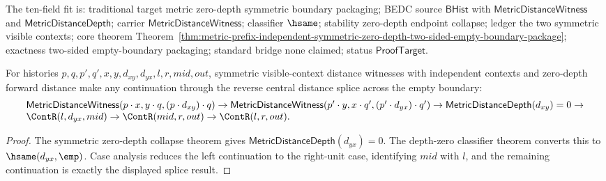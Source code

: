The ten-field fit is: traditional target metric zero-depth symmetric boundary
packaging; BEDC source $\mathsf{BHist}$ with
$\mathsf{MetricDistanceWitness}$ and $\mathsf{MetricDistanceDepth}$; carrier
$\mathsf{MetricDistanceWitness}$; classifier $\hsame$; stability zero-depth
endpoint collapse; ledger the two symmetric visible contexts; core theorem
Theorem~\ref{thm:metric-prefix-independent-symmetric-zero-depth-two-sided-empty-boundary-package};
exactness two-sided empty-boundary packaging; standard bridge none claimed;
status $\mathsf{ProofTarget}$.

\begin{theorem}
\label{thm:metric-prefix-independent-symmetric-zero-depth-continuation-splice}
For histories $p,q,p',q',x,y,d_{xy},d_{yx},l,r,mid,out$, symmetric
visible-context distance witnesses with independent contexts and zero-depth
forward distance make any continuation through the reverse central distance
splice across the empty boundary:
$$
\begin{array}{l}
\mathsf{MetricDistanceWitness}(p\cdot x,y\cdot q,(p\cdot d_{xy})\cdot q)
\to
\mathsf{MetricDistanceWitness}(p'\cdot y,x\cdot q',(p'\cdot d_{yx})\cdot q')
\to
\mathsf{MetricDistanceDepth}(d_{xy})=0
\to
\\
\ContR(l,d_{yx},mid)\to
\ContR(mid,r,out)\to
\ContR(l,r,out).
\end{array}
$$
\end{theorem}
\begin{proof}
The symmetric zero-depth collapse theorem gives
$\mathsf{MetricDistanceDepth}(d_{yx})=0$. The depth-zero classifier theorem
converts this to $\hsame(d_{yx},\emp)$. Case analysis reduces the left
continuation to the right-unit case, identifying $mid$ with $l$, and the
remaining continuation is exactly the displayed splice result.
\end{proof}

